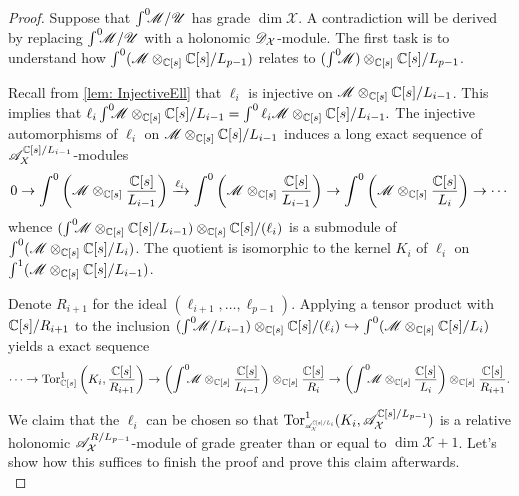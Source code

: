 \begin{proof}
  Suppose that $\int^0 \mkern -8mu\mathscr{M}/\mathscr{U}$ has grade $\dim \mathcal{X}$.
  A contradiction will be derived by replacing $\int^0 \mkern -8mu\mathscr{M}/\mathscr{U}$ with a holonomic $\mathscr{D}_\mathcal{X}$-module.
  The first task is to understand how $\int^0(\mathscr{M}\otimes_{\mathbb{C}[s]}\mathbb{C}[s]/L_{p-1})$ relates to $(\int^0 \mkern -8mu\mathscr{M})\otimes_{\mathbb{C}[s]}\mathbb{C}[s]/L_{p-1}$.

  Recall from \cref{lem: InjectiveEll} that $\ell_{i}$ is injective on $\mathscr{M} \otimes_{\mathbb{C}[s]} \mathbb{C}[s]/L_{i-1}$. This implies that
  $\ell_{i}\int^0 \mkern -8mu \mathscr{M} \otimes_{\mathbb{C}[s]} \mathbb{C}[s]/L_{i-1} = \int^0 \ell_{i}\mathscr{M}\otimes_{\mathbb{C}[s]} \mathbb{C}[s]/L_{i-1}.$
  The injective automorphisms of $\ell_i$ on $\mathscr{M} \otimes_{\mathbb{C}[s]} \mathbb{C}[s]/L_{i-1}$ induces a long exact sequence of $\mathscr{A}_X^{\mathbb{C}[s]/L_{i-1}}$-modules
  $$0 \to \int^0\left(\mathscr{M} \otimes_{\mathbb{C}[s]} \frac{\mathbb{C}[s]}{L_{i-1}}\right) \xrightarrow{\ell_i} \int^0 \left(\mathscr{M} \otimes_{\mathbb{C}[s]} \frac{\mathbb{C}[s]}{L_{i-1}}\right) \to \int^0\left(\mathscr{M} \otimes_{\mathbb{C}[s]} \frac{\mathbb{C}[s]}{L_{i}}\right) \to \cdots $$
  whence $(\int^0 \mkern -8mu \mathscr{M}\otimes_{\mathbb{C}[s]} \mathbb{C}[s]/L_{i-1})\otimes_{\mathbb{C}[s]} \mathbb{C}[s]/(\ell_{i})$ is a submodule of $\int^0(\mathscr{M} \otimes_{\mathbb{C}[s]} \mathbb{C}[s]/L_{i})$.
  The quotient is isomorphic to the kernel $K_i$ of $\ell_i$ on $\int^1(\mathscr{M} \otimes_{\mathbb{C}[s]} \mathbb{C}[s]/L_{i-1})$.


  Denote $R_{i+1}$ for the ideal $(\ell_{i+1},\ldots,\ell_{p-1})$. Applying a tensor product with $\mathbb{C}[s]/R_{i+1}$ to the inclusion $(\int^0 \mkern -8mu \mathscr{M}/L_{i-1}) \otimes_{\mathbb{C}[s]}\mathbb{C}[s]/(\ell_i)\hookrightarrow \int^0(\mathscr{M}\otimes_{\mathbb{C}[s]}\mathbb{C}[s]/L_i)$ yields a exact sequence
  $$\cdots \to \operatorname{Tor}_{\mathbb{C}[s]}^1\left(K_i, \frac{\mathbb{C}[s]}{R_{i+1}}\right) \to \left(\int^0 \mkern -8mu \mathscr{M}\otimes_{\mathbb{C}[s]}\frac{\mathbb{C}[s]}{L_{i-1}}\right) \otimes_{\mathbb{C}[s]}\frac{\mathbb{C}[s]}{R_{i}} \to \left(\int^0 \mkern -8mu\mathscr{M}\otimes_{\mathbb{C}[s]}\frac{\mathbb{C}[s]}{L_i}\right)\otimes_{\mathbb{C}[s]}\frac{\mathbb{C}[s]}{R_{i+1}}.$$

  We claim that the $\ell_i$ can be chosen so that $\Tor_{\scaleto{\A_\mathcal{X}^{\C[s]/L_i}}{7pt}}^1(K_i, \A_\mathcal{X}^{\C[s]/L_{p-1}})$ is a relative holonomic $\mathscr{A}_\mathcal{X}^{R/L_{p-1}}$-module of grade greater than or equal to $\dim\mathcal{X}+1$.
  Let's show how this suffices to finish the proof and prove this claim afterwards. \\


\end{proof}
